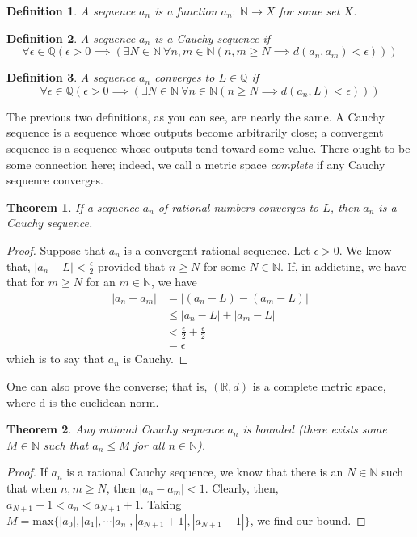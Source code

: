 \documentclass{article}
\newtheorem{thm}{Theorem}[section]
\newtheorem{defn}{Definition}[section]
\numberwithin{equation}{section}
\begin{document}
    \begin{defn}
        A sequence $a_n$ is a function $a_n: \ \mathbb{N} \to X$ for some set $X$.
    \end{defn}
    \begin{defn}
        A sequence $a_n$ is a Cauchy sequence if $$\forall \epsilon \in \mathbb{Q}( \epsilon>0 \implies (\exists N \in \mathbb{N} \ \forall n, m \in \mathbb{N} (n, m \geq N \implies d(a_n, a_m)< \epsilon)))$$
    \end{defn}
    \begin{defn}
        A sequence $a_n$ converges to $L \in \mathbb{Q}$ if  $$\forall \epsilon \in \mathbb{Q}( \epsilon>0 \implies (\exists N \in \mathbb{N} \ \forall n \in \mathbb{N} (n \geq N \implies d(a_n, L)< \epsilon)))$$
    \end{defn}
    The previous two definitions, as you can see, are nearly the same. A Cauchy sequence is a sequence whose outputs 
    become arbitrarily close; a convergent sequence is a sequence whose outputs tend toward some value. There ought to be some connection here; indeed,
    we call a metric space \emph{complete} if any Cauchy sequence converges.
    \begin{thm}
        If a sequence $a_n$ of rational numbers converges to $L$, then $a_n$ is a Cauchy sequence.
    \end{thm}
    \begin{proof}
        Suppose that $a_n$ is a convergent rational sequence. Let $\epsilon>0$. We know that, $|a_n-L|<\frac{\epsilon}{2}$ provided that $n \geq N$ for some $N \in \mathbb{N}$. If, in addicting, we have that for $m \geq N$ for an $m \in \mathbb{N}$, we have
        \begin{align}
            |a_n-a_m|&=|(a_n-L)-(a_m-L)| \\
            &\leq |a_n-L|+|a_m-L| \\
            &< \frac{\epsilon}{2} + \frac{\epsilon}{2} \\
            &= \epsilon
        \end{align}
        which is to say that $a_n$ is Cauchy.
    \end{proof}
    One can also prove the converse; that is, $(\mathbb{R}, d)$ is a complete metric space, where d is the euclidean norm.
    \begin{thm}
    Any rational Cauchy sequence $a_n$ is bounded (there exists some $M \in \mathbb{N}$ such that $a_n \leq M$ for all $n \in \mathbb{N}$). 
    \end{thm}
    \begin{proof}
        If $a_n$ is a rational Cauchy sequence, we know that there is an $N \in \mathbb{N}$ such that when $n,m \geq N$, then $ |a_n-a_m|< 1$. Clearly, then,
        $a_{N+1}-1<a_n<a_{N+1}+1$. Taking $M=\mathrm{max}\{|a_0|, |a_1|, \cdots |a_n|, |a_{N+1}+1|, |a_{N+1}-1| \}$, we find our bound.
    \end{proof}
\end{document}

